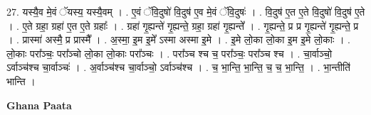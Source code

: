 \documentclass[17pt]{extarticle}
\begin{document}
27. यस्यै॒व मे॒वं ॅयस्य॒ यस्यै॒वम् । . ए॒वं ॅवि॒दुषो॑ वि॒दुष॑ ए॒व मे॒वं ॅवि॒दुषः॑ । . वि॒दुष॑ ए॒त ए॒ते वि॒दुषो॑ वि॒दुष॑ ए॒ते । . ए॒ते ग्रहा॒ ग्रहा॑ ए॒त ए॒ते ग्रहाः᳚ । . ग्रहा॑ गृ॒ह्यन्ते॑ गृ॒ह्यन्ते॒ ग्रहा॒ ग्रहा॑ गृ॒ह्यन्ते᳚ । . गृ॒ह्यन्ते॒ प्र प्र गृ॒ह्यन्ते॑ गृ॒ह्यन्ते॒ प्र । . प्रास्मा॑ अस्मै॒ प्र प्रास्मै᳚ । . अ॒स्मा॒ इ॒म इ॒मे᳚ ऽस्मा अस्मा इ॒मे । . इ॒मे लो॒का लो॒का इ॒म इ॒मे लो॒काः । . लो॒काः परा᳚ञ्चः॒ परा᳚ञ्चो लो॒का लो॒काः परा᳚ञ्चः । . परा᳚ञ्च श्च च॒ परा᳚ञ्चः॒ परा᳚ञ्च श्च । . चा॒र्वाञ्चो॒ ऽर्वाञ्च॑श्च चा॒र्वाञ्चः॑ । . अ॒र्वाञ्च॑श्च चा॒र्वाञ्चो॒ ऽर्वाञ्च॑श्च । . च॒ भा॒न्ति॒ भा॒न्ति॒ च॒ च॒ भा॒न्ति॒ । . भा॒न्तीति॑ भान्ति । \newline

\textbf{Ghana Paata } \newline
\end{document}
